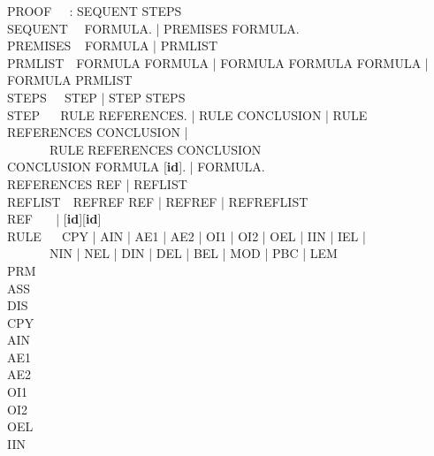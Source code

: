 \documentclass[BA.tex]{subfiles}
\begin{document}
\newcommand{\id}{{\bf id}}
{\ttfamily
\noindent
PROOF $~~~~~$\tra \id: SEQUENT STEPS\\
SEQUENT $~~~$\tra {} FORMULA. | 
                   PREMISES FORMULA.\\
PREMISES $~~$\tra {} FORMULA
                |  PRMLIST\\
PRMLIST $~~~$\tra FORMULA  FORMULA
                | FORMULA\txt{, } FORMULA FORMULA 
                | FORMULA\txt{, } PRMLIST\\
STEPS $~~~~~$\tra STEP | STEP STEPS\\
STEP $~~~~~~$\tra RULE REFERENCES. | RULE CONCLUSION 
                | RULE  REFERENCES CONCLUSION |\\
$~~~~~~~~~~~~~~$  RULE REFERENCES CONCLUSION\\
CONCLUSION   \tra {} FORMULA [\id]. 
                |  FORMULA.\\
REFERENCES   \tra REF | REFLIST\\
REFLIST $~~~$\tra REF\txt{, }REF REF | REFREF |
                  REF\txt{, }REFLIST\\
REF $~~~~~~~$\tra [\id] | [\id]\txt{ - }[\id]\\
RULE $~~~~~~$\tra CPY | AIN | AE1 | AE2 | OI1 | OI2 | OEL | IIN | IEL |\\
$~~~~~~~~~~~~~~$  NIN | NEL | DIN | DEL | BEL | MOD | PBC | LEM\\
PRM $~~~~~~~$\tra{}\\
ASS $~~~~~~~$\tra{}\\
DIS $~~~~~~~$\tra{}\\
CPY $~~~~~~~$\tra{}\\
AIN $~~~~~~~$\tra{}\\
AE1 $~~~~~~~$\tra{}\\
AE2 $~~~~~~~$\tra{}\\
OI1 $~~~~~~~$\tra{}\\
OI2 $~~~~~~~$\tra{}\\
OEL $~~~~~~~$\tra{}\\
IIN $~~~~~~~$\tra{}\\
}
\end{document}

